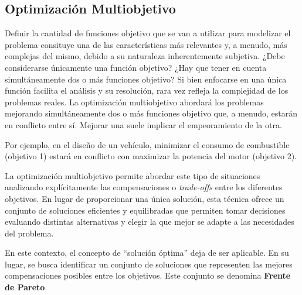 \documentclass[12pt,a4paper]{book}
\begin{document}
\subsection{Optimización Multiobjetivo}

Definir la cantidad de funciones objetivo que se van a utilizar para modelizar el problema consituye una de las características más relevantes y, a menudo, más complejas del mismo, debido a su naturaleza inherentemente subjetiva.
¿Debe considerarse únicamente una función objetivo? ¿Hay que tener en cuenta simultáneamente 
dos o más funciones objetivo? Si bien enfocarse en una única función facilita el análisis y su resolución, rara vez refleja la complejidad de los problemas reales. La optimización multiobjetivo
abordará los problemas mejorando simultáneamente dos o más funciones objetivo que, a menudo, estarán en conflicto entre sí. Mejorar una suele implicar el empeoramiento de la otra.

Por ejemplo, en el diseño de un vehículo, minimizar el consumo de combustible (objetivo 1) estará en conflicto con maximizar la potencia del motor (objetivo 2).

La optimización multiobjetivo permite abordar este tipo de situaciones analizando
explícitamente las compensaciones o \textit{trade-offs} entre los diferentes objetivos. En lugar de proporcionar una única solución, esta técnica ofrece un conjunto de soluciones eficientes y equilibradas que permiten
tomar decisiones evaluando distintas alternativas y elegir la que mejor se adapte a las necesidades del problema.

En este contexto, el concepto de “solución óptima” deja de ser aplicable. En su lugar, se busca identificar un conjunto de soluciones que representen las mejores compensaciones posibles entre los objetivos. Este conjunto se denomina \textbf{Frente de Pareto}.
\end{document}
